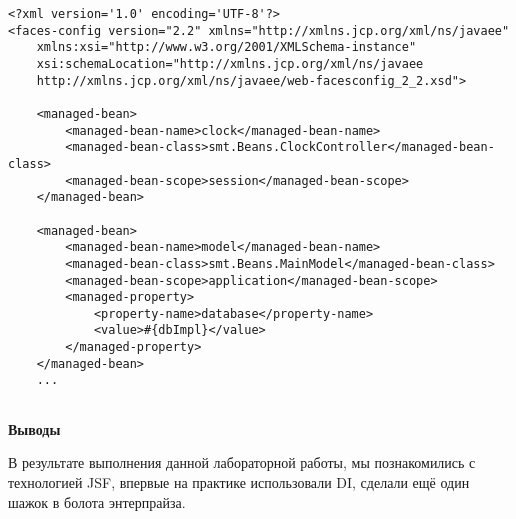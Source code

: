 \documentclass[14pt,a4paper,report]{ncc}
\begin{document}
\begin{lstlisting}
<?xml version='1.0' encoding='UTF-8'?>
<faces-config version="2.2" xmlns="http://xmlns.jcp.org/xml/ns/javaee"
    xmlns:xsi="http://www.w3.org/2001/XMLSchema-instance"
    xsi:schemaLocation="http://xmlns.jcp.org/xml/ns/javaee 
    http://xmlns.jcp.org/xml/ns/javaee/web-facesconfig_2_2.xsd">

    <managed-bean>
        <managed-bean-name>clock</managed-bean-name>
        <managed-bean-class>smt.Beans.ClockController</managed-bean-class>
        <managed-bean-scope>session</managed-bean-scope>
    </managed-bean>

    <managed-bean>
        <managed-bean-name>model</managed-bean-name>
        <managed-bean-class>smt.Beans.MainModel</managed-bean-class>
        <managed-bean-scope>application</managed-bean-scope>
        <managed-property>
            <property-name>database</property-name>
            <value>#{dbImpl}</value>
        </managed-property>
    </managed-bean>
    ...
    
\end{lstlisting}

\large \textbf{Выводы}
\small
\par
В результате выполнения данной лабораторной работы, мы познакомились с технологией JSF, впервые на практике использовали DI, сделали ещё один шажок в болота энтерпрайза.\\
\end{document}
